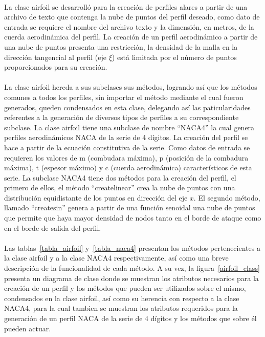 \documentclass[letterpaper, openright, 12pt]{book}
\begin{document}
    \paragraph*{}
    La clase airfoil se desarrolló para la creación de perfiles alares a
    partir de una archivo de texto que contenga la nube de puntos del perfil
    deseado, como dato de entrada se requiere el nombre del archivo texto y la
    dimensión, en metros, de la cuerda aerodinámica del perfil. La creación de
    un perfil aerodinámico a partir de una nube de puntos presenta una
    restricción, la densidad de la malla en la dirección tangencial al perfil
    (eje $\xi$) está limitada por el número de puntos proporcionados para su
    creación.

    \paragraph*{}
        La clase airfoil hereda a sus subclases sus métodos, logrando así que
        los métodos comunes a todos los perfiles, sin importar el método
        mediante el cual fueron generados, queden condensados en esta clase,
        delegando así las paticularidades referentes a la generación de
        diversos tipos de perfiles a su correspondiente subclase. La clase
        airfoil tiene una subclase de nombre ``NACA4'' la cual genera
        perfiles aerodinámicos NACA de la serie de 4 dígitos. La creación del
        perfil se hace a partir de la ecuación constitutiva de la serie. Como
        datos de entrada se requieren los valores de m (combudara máxima),
        p (posición de la combadura máxima), t (espesor máximo) y c (cuerda
        aerodinámica) característicos de esta serie.
        La subclase NACA4 tiene dos métodos para la creación del perfil, el
        primero de ellos, el método ``create\textunderscore linear'' crea la
        nube de puntos con una distribución equidistante de los puntos en
        dirección del eje $x$. El segundo método, llamado
        ``create\textunderscore sin'' genera a partir de una función senoidal
        una nube de puntos que permite que haya mayor densidad de nodos tanto
        en el borde de ataque como en el borde de salida del perfil.

    \paragraph*{}
        Las tablas~\ref{tabla_airfoil} y~\ref{tabla_naca4} presentan los
        métodos pertenecientes a la clase airfoil y a la clase NACA4
        respectivamente, así como una breve descripción de la funcionalidad de
        cada método. A su vez, la figura~\ref{airfoil_class} presenta un
        diagrama de clase donde se muestran los atributos necesarios para la
        creación de un perfil y los métodos que pueden ser utilizados sobre el
        mismo, condensados en la clase airfoil, así como su herencia con
        respecto a la clase NACA4, para la cual tambien se muestran los
        atributos requeridos para la generación de un perfil NACA de la serie
        de 4 dígitos y los métodos que sobre él pueden actuar.
\end{document}
